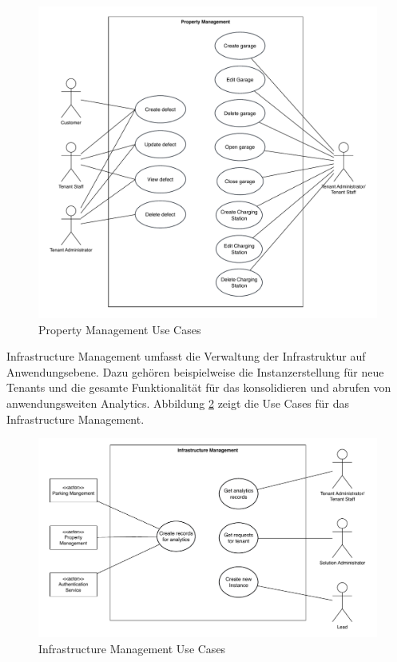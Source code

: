 \begin{figure}[ht]
    \centering
    \includegraphics[width=\textwidth]{resources/prop-ma-use-cases.pdf}
    \caption{Property Management Use Cases}
    \label{fig:prop-ma-use-cases}
\end{figure}

Infrastructure Management umfasst die Verwaltung der Infrastruktur auf Anwendungsebene. Dazu gehören beispielweise die Instanzerstellung für neue Tenants und die gesamte Funktionalität für das konsolidieren und abrufen von anwendungsweiten Analytics. Abbildung \ref{fig:inf-ma-use-cases} zeigt die Use Cases für das Infrastructure Management.

\begin{figure}[ht]
    \centering
    \includegraphics[width=\textwidth]{resources/inf-ma-use-cases.pdf}
    \caption{Infrastructure Management Use Cases}
    \label{fig:inf-ma-use-cases}
\end{figure}


